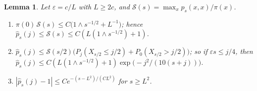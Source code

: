 \documentclass[11pt]{amsart}
\newtheorem{lemma}[theorem]{Lemma}
\theoremstyle{remark}
\newcommand{\eps}{\varepsilon}
\begin{document}
\begin{lemma}\label{lem:kernel}
Let $\eps=c/L$ with $L\ge 2c$, and $\mathcal S(s)=\max_x p_s(x,x)/\pi(x)$.
\begin{enumerate}
\item[(a)] $\pi(0)\,\mathcal S(s)\le C\bigl(1\wedge s^{-1/2}+L^{-1}\bigr)$; hence $\hat p_s(j)\le\mathcal S(s)\le C(L(1\wedge s^{-1/2})+1)$.
\item[(b)] $\hat p_s(j)\le\mathcal S(s/2)\bigl(P_j(X_{s/2}\le j/2)+P_0(X_{s/2}>j/2)\bigr)$; so if $\eps s\le j/4$, then
$\hat p_s(j)\le C(L(1\wedge s^{-1/2})+1)\exp\bigl(-j^2/(10(s+j))\bigr)$.
\item[(c)] $|\hat p_s(j)-1|\le Ce^{-(s-L^2)/(CL^2)}$ for $s\ge L^2$.
\end{enumerate}
\end{lemma}
\end{document}

